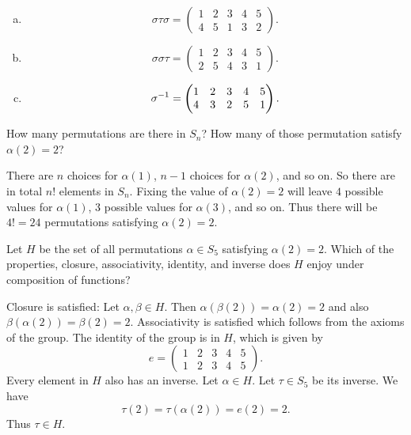 \begin{solution}
	\begin{enumerate}[(a)]
		\item 
		\[ \sigma\tau\sigma = \begin{pmatrix} 1 & 2 & 3 & 4 & 5 \\ 4 & 5 & 1 & 3 & 2 \end{pmatrix}. \]
		\item 
		\[ \sigma \sigma \tau = \begin{pmatrix} 1 & 2 & 3 & 4 & 5 \\ 2 & 5 & 4 & 3 & 1 \end{pmatrix}. \]
		\item 
		\[ \sigma^{-1} = \begin{pmatrix} 1 & 2 & 3 & 4 & 5 \\ 4 & 3 & 2 & 5 & 1 \end{pmatrix}. \]
	\end{enumerate}
\end{solution}

\begin{problem}
	How many permutations are there in $ S_n $? How many of those permutation satisfy $ \alpha(2) = 2 $?
\end{problem}
\begin{solution}
	There are $ n $ choices for $ \alpha(1) $, $ n-1 $ choices for $ \alpha(2) $, and so on. So there are in total $ n! $ elements in $ S_n $. Fixing the value of $ \alpha(2) = 2 $ will leave $ 4 $ possible values for $ \alpha(1) $, 3 possible values for $ \alpha(3) $, and so on. Thus there will be $ 4! = 24 $ permutations satisfying $ \alpha(2) = 2 $.
\end{solution}

\begin{problem}
	Let $ H $ be the set of all permutations $ \alpha \in S_5 $ satisfying $ \alpha(2) =2 $. Which of the properties, closure, associativity, identity, and inverse does $ H $ enjoy under composition of functions?
\end{problem}
\begin{solution}
	Closure is satisfied: Let $ \alpha,\beta \in H $. Then $ \alpha(\beta(2)) = \alpha(2) = 2 $ and also $ \beta(\alpha(2)) = \beta(2) = 2 $. Associativity is satisfied which follows from the axioms of the group. The identity of the group is in $ H $, which is given by
	\[ e = \begin{pmatrix} 1 & 2 & 3 & 4 & 5 \\ 1 & 2 & 3 & 4 & 5\end{pmatrix}. \] 
	Every element in $ H $ also has an inverse. Let $ \alpha \in H $. Let $ \tau \in S_5 $ be its inverse. We have
	\[ \tau(2) = \tau(\alpha(2)) = e(2) = 2. \]
	Thus $ \tau \in H $.
\end{solution}

